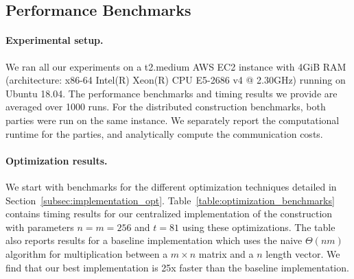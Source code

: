 
\subsection{Performance Benchmarks}
\label{subsec:performance}
\paragraph{Experimental setup.}
We ran all our experiments on a t2.medium AWS EC2 instance with 4GiB RAM (architecture: x86-64 Intel(R) Xeon(R) CPU E5-2686 v4 @ 2.30GHz) running on Ubuntu 18.04. The performance benchmarks and timing results we provide are averaged over 1000 runs. For the distributed construction benchmarks, both parties were run on the same instance. We separately report the computational runtime for the parties, and analytically compute the communication costs. 

\iffull
\paragraph{Optimization results.}
We start with benchmarks for the different optimization techniques detailed in Section~\ref{subsec:implementation_opt}. Table~\ref{table:optimization_benchmarks} contains timing results for our centralized implementation of the \ttwPRF construction with parameters $n=m=256$ and $t=81$ using these optimizations. The table also reports results for a baseline implementation which uses the naive $\Theta(nm)$ algorithm for multiplication between a $m \times n$ matrix and a $n$ length vector. We find that our best implementation is 25x faster than the baseline implementation.
\else
\fi


